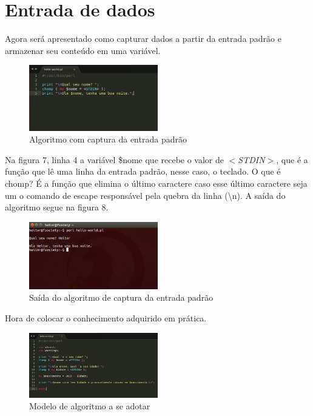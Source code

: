 \chapter{Entrada de dados}

Agora ser\'a apresentado como capturar dados a partir da entrada padr\~ao e armazenar seu conte\'udo em uma vari\'avel.

\begin{figure}[!htb]
	\centering
	\includegraphics[width=0.5\textwidth]{../5_figuras/image7}
	\caption{Algoritmo com captura da entrada padr\~ao}
\end{figure}

Na figura 7, linha 4 a vari\'avel \$nome que recebe o valor de \textit{$<$STDIN$>$}, que \'e a fun\c{c}\~ao que l\^e uma linha da entrada padr\~ao, 
nesse caso, o teclado. O que \'e chomp? \'E a fun\c{c}\~ao que elimina o \'ultimo caractere caso esse \'ultimo caractere seja um o comando de escape 
respons\'avel pela quebra da linha (\textbackslash n). A sa\'ida do algoritmo segue na figura 8.

\begin{figure}[!htb]
	\centering
	\includegraphics[width=0.5\textwidth]{../5_figuras/image8}
	\caption{Sa\'ida do algoritmo de captura da entrada padr\~ao}
\end{figure}

Hora de colocar o conhecimento adquirido em pr\'atica. 

\begin{figure}[!htb]
	\centering
	\includegraphics[width=0.5\textwidth]{../5_figuras/image9}
	\caption{Modelo de algoritmo a se adotar}
\end{figure}

